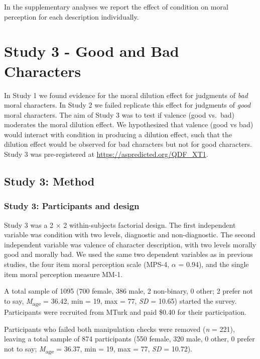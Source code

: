 \documentclass[
  english,
  man,floatsintext]{apa7}
\begin{document}
In the supplementary analyses we report the effect of condition on moral perception for each description individually.

\hypertarget{study-3---good-and-bad-characters}{%
\section{Study 3 - Good and Bad Characters}\label{study-3---good-and-bad-characters}}

In Study 1 we found evidence for the moral dilution effect for judgments of \emph{bad} moral characters. In Study 2 we failed replicate this effect for judgments of \emph{good} moral characters. The aim of Study 3 was to test if valence (good vs.~bad) moderates the moral dilution effect. We hypothesized that valence (good vs bad) would interact with condition in producing a dilution effect, such that the dilution effect would be observed for bad characters but not for good characters. Study 3 was pre-registered at \color{blue}\url{https://aspredicted.org/QDF_XT1}\color{black}.

\hypertarget{study-3-method}{%
\subsection{Study 3: Method}\label{study-3-method}}

\hypertarget{study-3-participants-and-design}{%
\subsubsection{Study 3: Participants and design}\label{study-3-participants-and-design}}

Study 3 was a 2 \(\times\) 2 within-subjects factorial design. The first independent variable was condition with two levels, diagnostic and non-diagnostic. The second independent variable was valence of character description, with two levels morally good and morally bad. We used the same two dependent variables as in previous studies, the four item moral perception scale (MPS-4, \(\alpha\) = 0.94), and the single item moral perception measure MM-1.

A total sample of 1095 (700 female, 386 male, 2 non-binary, 0 other; 2 prefer not to say, \emph{M}\textsubscript{age} = 36.42, min = 19, max = 77, \emph{SD} = 10.65) started the survey. Participants were recruited from MTurk and paid \$0.40 for their participation.

Participants who failed both manipulation checks were removed (\emph{n} = 221), leaving a total sample of 874 participants (550 female, 320 male, 0 other, 0 prefer not to say; \emph{M}\textsubscript{age} = 36.37, min = 19, max = 77, \emph{SD} = 10.72).
\end{document}
